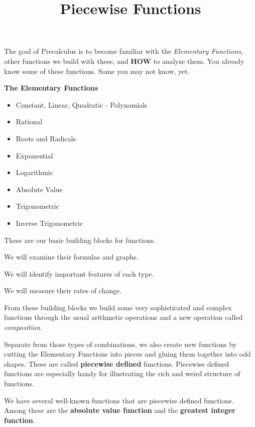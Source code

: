 \documentclass{ximera}
\title{Piecewise Functions}
\begin{document}
\begin{abstract}
\end{abstract}
\maketitle



The goal of Precalculus is to become familiar with the \textit{Elementary Functions}, other functions we build with these, and \textbf{\textcolor{blue!55!black}{HOW}} to analyze them. You already know some of these functions. Some you may not know, yet.


\begin{summary} \textbf{\textcolor{red!70!yellow}{The Elementary Functions}}  
	\begin{itemize}
		\item Constant, Linear, Quadratic - Polynomials
		\item Rational
		\item Roots and Radicals
		\item Exponential
		\item Logarithmic
		\item Absolute Value
		\item Trigonometric 
		\item Inverse Trigonometric 
	\end{itemize}
\end{summary}




These are our basic building blocks for functions.  

We will examine their formulas and graphs.  

We will identify important features of each type. 

We will measure their rates of change. 

From these building blocks we build some very sophisticated and complex functions through the usual arithmetic operations and a new operation called \textit{composition}. 

Separate from those types of combinations, we also create new functions by cutting the Elementary Functions into pieces and gluing them together into odd shapes.   These are called \textbf{piecewise defined} functions.  Piecewise defined functions are especially handy for illustrating the rich and weird structure of functions.


We have several well-known functions that are piecewise defined functions. Among these are the \textbf{absolute value function} and the \textbf{greatest integer function}.
\end{document}
